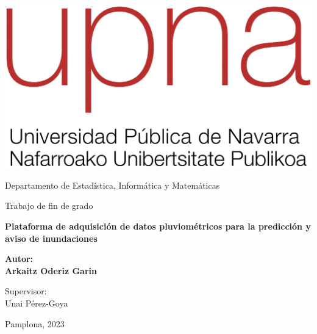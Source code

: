 \begin{titlepage}

  \begin{center}


    \includegraphics[scale=.3]{style/fig/ROJO_UPNA_300ppp.png}

    \vspace{0.5cm}
    \normalsize{Departamento de Estadística, Informática y Matemáticas}

    \vspace{2.5cm}

    {\large Trabajo de fin de grado}\\
    \vspace{1cm}

    \textbf{\Large Plataforma de adquisición de datos pluviométricos para la predicción y aviso de inundaciones}

    \vspace{3cm}

    \large{\textbf{Autor:}}\\
    \large{\textbf{Arkaitz Oderiz Garin}}\\

    \vspace{1cm}

    \large{Supervisor:}\\
    \large{Unai Pérez-Goya}\\

    \vspace{3cm}

    \large{Pamplona, 2023}

  \end{center}

\end{titlepage}

\clearpage
\thispagestyle{empty}
\hfill
\clearpage
